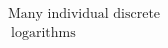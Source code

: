 \documentclass[preview]{standalone}
\begin{document}
\begin{align*}
\text{Many individual discrete} \\\ \text{logarithms}
\end{align*}
\end{document}
